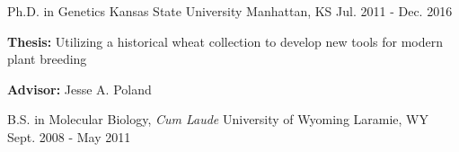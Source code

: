 
\begin{cventries}

  \cventry
    {Ph.D. in Genetics} %
    {Kansas State University} %
    {Manhattan, KS} %
    {Jul. 2011 - Dec. 2016} %
    {
      \begin{cvitems} %
        \item {\textbf{Thesis:} Utilizing a historical wheat collection to develop new tools for modern plant breeding}
        \item {\textbf{Advisor:} Jesse A. Poland}
      \end{cvitems}
    }

  \cventry
    {B.S. in Molecular Biology, \textit{Cum Laude}} %
    {University of Wyoming} %
    {Laramie, WY} %
    {Sept. 2008 - May 2011} %
    {}
    
\end{cventries}